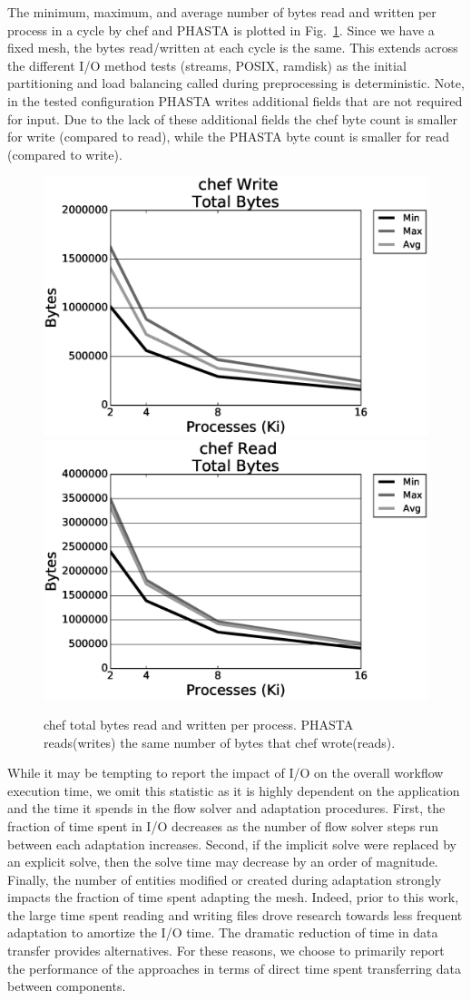 The minimum, maximum, and average number of bytes read and written per process
in a cycle by chef and PHASTA is plotted in
Fig.~\ref{fig:totalBytes}.
Since we have a fixed mesh, the bytes read/written at each cycle is the same.
This extends across the different I/O method tests (streams, POSIX,
ramdisk) as the initial partitioning and load balancing called during
preprocessing is deterministic.
Note, in the tested configuration PHASTA writes additional fields that are not
required for input.
Due to the lack of these additional fields the chef byte count is smaller for
write (compared to read), while the PHASTA byte count is smaller for read
(compared to write).

\begin{figure} \centering
  \includegraphics[width=.49\textwidth]{results/phasta-dambreak/theta/streamchefWriteTotalBytes.eps}
  \includegraphics[width=.49\textwidth]{results/phasta-dambreak/theta/streamchefReadTotalBytes.eps}
  \caption{
    chef total bytes read and written per process. PHASTA reads(writes) the same number of
    bytes that chef wrote(reads).
  }
  \label{fig:totalBytes}
\end{figure}

While it may be tempting to report the impact of I/O on the overall workflow
execution time, we omit this statistic as it is highly dependent on the
application and the time it spends in the flow solver and adaptation procedures.
First, the fraction of time spent in I/O decreases as the number of flow solver
steps run between each adaptation increases.
Second, if the implicit solve were replaced by an explicit solve, then the solve
time may decrease by an order of magnitude.
Finally, the number of entities modified or created during adaptation strongly
impacts the fraction of time spent adapting the mesh.
Indeed, prior to this work, the large time spent reading and writing files drove
research towards less frequent adaptation to amortize the I/O time.
The dramatic reduction of time in data transfer provides alternatives.
For these reasons, we choose to primarily report the performance of the
approaches in terms of direct time spent transferring data between components.

